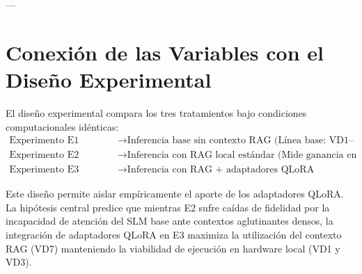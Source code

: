 \documentclass[12pt]{article}
\begin{document}
---

\section{Conexión de las Variables con el Diseño Experimental}
El diseño experimental compara los tres tratamientos bajo condiciones computacionales idénticas:
\begin{align*}
    \text{Experimento E1 (Control 1)} &\longrightarrow \text{Inferencia base sin contexto RAG (Línea base: VD1--VD3, VD4, VD6)} \\
    \text{Experimento E2 (Control 2)} &\longrightarrow \text{Inferencia con RAG local estándar (Mide ganancia en VD7--VD8 y costo en VD1--VD3)} \\
    \text{Experimento E3 (Tratamiento)} &\longrightarrow \text{Inferencia con RAG + adaptadores QLoRA (Maximiza VD7 y VD4)}
\end{align*}

Este diseño permite aislar empíricamente el aporte de los adaptadores QLoRA. La hipótesis central predice que mientras E2 sufre caídas de fidelidad por la incapacidad de atención del SLM base ante contextos aglutinantes densos, la integración de adaptadores QLoRA en E3 maximiza la utilización del contexto RAG (VD7) manteniendo la viabilidad de ejecución en hardware local (VD1 y VD3).
\end{document}
